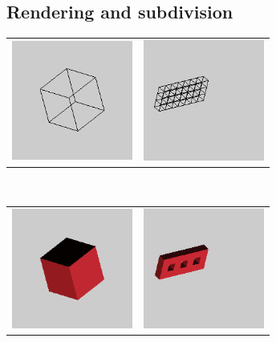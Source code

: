 \documentclass[12pt,a4paper]{scrartcl}
\begin{document}
\subsection{Rendering and subdivision}

\begin{center}
	\begin{tabular}{cc}
		\includegraphics[width=150px, height=150px]{Images/cube-wireframe.png} 
		& \includegraphics[width=150px, height=150px]{Images/threeholes-wireframe.png}  \\
	\end{tabular}
	\ \\
	\begin{tabular}{cc}
		\includegraphics[width=150px, height=150px]{Images/cube-solid.png} 
		& \includegraphics[width=150px, height=150px]{Images/threeholes-solid.png}  \\

\end{tabular}
\end{center}
\end{document}
